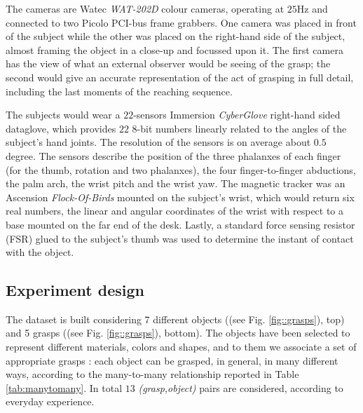 \documentclass{article}
\begin{document}
%

The cameras are Watec \emph{WAT-202D} colour cameras, operating at $25$Hz and
connected to two Picolo PCI-bus frame grabbers. One camera
was placed in front of the subject while the other was placed on the right-hand side
of the subject, almost framing the object in a close-up and focussed upon it. The
first camera has the view of what an external observer would be seeing of the grasp;
the second would give an accurate representation of the act of grasping in full detail,
including the last moments of the reaching sequence.

The subjects would wear a $22$-sensors Immersion \emph{CyberGlove}
\cite{cyberglove} right-hand sided dataglove,
which provides $22$ $8$-bit numbers linearly related to the
angles of the subject's hand joints. The resolution of the sensors is on average about
$0.5$ degree. The sensors describe the position of the three phalanxes of each finger
(for the thumb, rotation and two phalanxes), the four finger-to-finger abductions,
the palm arch, the wrist pitch and the wrist yaw. The magnetic tracker was an
Ascension \emph{Flock-Of-Birds} \cite{fob} mounted on the subject's wrist, which
would return six real numbers, the linear and angular coordinates of the wrist
with respect to a base mounted on the far end of the desk. Lastly, a standard force
sensing resistor (FSR) glued to the subject's thumb was used to determine the
instant of contact with the object.

\subsection{Experiment design}

The dataset is built considering 7 different objects ((see Fig. \ref{fig::grasps}), top)
and 5 grasps ((see Fig. \ref{fig::grasps}), bottom). The objects have been selected to
represent different materials, colors and shapes, and to them we associate a set of
appropriate grasps \cite{grasp_project}: each object can be grasped, in general, in
many different ways, according to the many-to-many relationship reported in Table
\ref{tab:manytomany}. In total $13$ {\em (grasp,object)} pairs are considered, according
to everyday experience.
\end{document}
